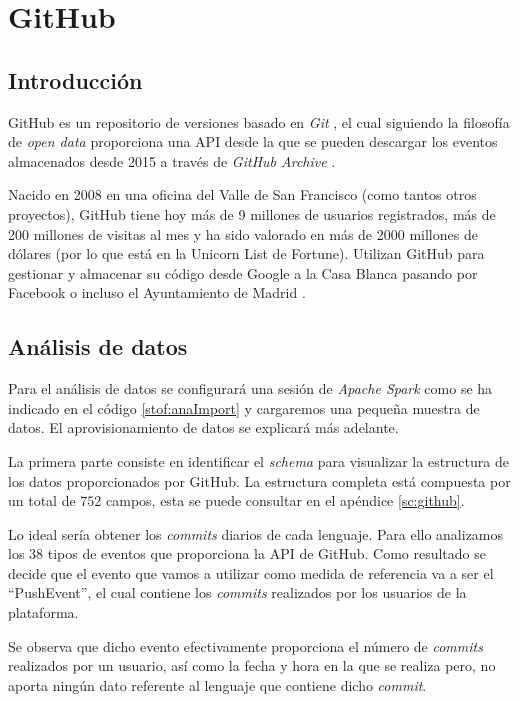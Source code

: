 \chapter{GitHub \label{sec:github}}

\section{Introducción}
GitHub es un repositorio de versiones basado en \textit{Git} \cite{git}, el cual siguiendo la filosofía de \textit{open data} \cite{opendata} proporciona una \gls{API} desde la que se pueden descargar los eventos almacenados desde 2015 a través de \textit{GitHub Archive} \cite{githubArchive}.

Nacido en 2008 en una oficina del Valle de San Francisco (como tantos otros proyectos), GitHub tiene hoy más de 9 millones de usuarios registrados, más de 200 millones de visitas al mes y ha sido valorado en más de 2000 millones de dólares (por lo que está en la Unicorn List \cite{unicornList} de Fortune). Utilizan GitHub para gestionar y almacenar su código desde Google a la Casa Blanca pasando por Facebook o incluso el Ayuntamiento de Madrid \cite{gitAytoMad}.

\clearpage
\section{Análisis de datos}
Para el análisis de datos se configurará una sesión de \textit{Apache Spark} como se ha indicado en el código \ref{stof:anaImport} y cargaremos una pequeña muestra de datos. El aprovisionamiento de datos se explicará más adelante.

La primera parte consiste en identificar el \textit{schema} para visualizar la estructura de los datos proporcionados por GitHub. La estructura completa está compuesta por un total de $752$ campos, esta se puede consultar en el apéndice \ref{sc:github}.

Lo ideal sería obtener los \textit{commits} diarios de cada lenguaje. Para ello analizamos los 38 tipos de eventos \cite{gitEvents} que proporciona la \gls{API} de GitHub. Como resultado se decide que el evento que vamos a utilizar como medida de referencia va a ser el ``PushEvent'', el cual contiene los \textit{commits} realizados por los usuarios de la plataforma.

Se observa que dicho evento efectivamente proporciona el número de \textit{commits} realizados por un usuario, así como la fecha y hora en la que se realiza pero, no aporta ningún dato referente al lenguaje que contiene dicho \textit{commit}.

